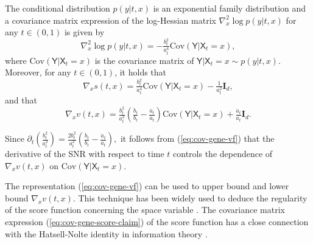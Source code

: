 \documentclass[twoside,11pt]{article}
\def\rmI{{\mathbf{I}}}
\newcommand{\Cov}{\mathrm{Cov}}
\def\paref#1{(\ref{#1})}
\numberwithin{equation}{section}
\begin{document}
\begin{lemma} \label{lm:cond-cov}
The conditional distribution $p(y | t, x)$ is an exponential family distribution and a covariance matrix expression of the log-Hessian matrix $\nabla^2_x \log p(y | t, x)$ for any $t \in (0, 1)$ is given by
\begin{equation}
    \label{eq:cov-cond-score-claim}
    \nabla^2_x \log p(y | t, x) = - \tfrac{b_t^2} {a_t^4} \Cov (\mathsf{Y} | \mathsf{X}_t = x),
\end{equation}
where $\Cov (\mathsf{Y} | \mathsf{X}_t = x)$ is the covariance matrix of $\mathsf{Y} | \mathsf{X}_t = x \sim p(y | t, x)$.
Moreover, for any $t \in (0, 1)$, it holds that
\begin{equation}
    \label{eq:cov-gene-score-claim}
    \nabla_x s(t, x) = \tfrac{b_t^2} {a_t^4} \Cov (\mathsf{Y} | \mathsf{X}_t = x) - \tfrac{1}{a_t^2} \rmI_d,
\end{equation}
and that
\begin{equation}
    \label{eq:cov-gene-vf}
    \nabla_x v(t, x) = \tfrac{b_t^2}{a_t^2} \left( \tfrac{\dot{b}_t}{b_t} - \tfrac{\dot{a}_t}{a_t} \right) \Cov (\mathsf{Y} | \mathsf{X}_t = x) + \tfrac{\dot{a}_t} {a_t} \rmI_d.
\end{equation}
\end{lemma}

\begin{remark}
Since $\partial_t \left( \tfrac{b_t^2}{a_t^2} \right) = \tfrac{2 b_t^2}{a_t^2} \left( \tfrac{\dot{b}_t}{b_t} - \tfrac{\dot{a}_t}{a_t} \right),$
it follows from (\ref{eq:cov-gene-vf}) that the derivative of the SNR with respect to  time $t$ controls the dependence of $\nabla_x v(t, x)$ on $\Cov (\mathsf{Y} | \mathsf{X}_t = x)$.
\end{remark}


The representation \paref{eq:cov-gene-vf} can be used to upper bound and lower bound $\nabla_x v(t, x)$. This technique has been widely used to deduce the regularity of the score function concerning the space variable \citep{mikulincer2021brownian, mikulincer2023lipschitz, chen2023sampling, lee2023convergence, chen2023improved}. The covariance matrix expression \paref{eq:cov-gene-score-claim} of the score function has a close connection with the Hatsell-Nolte identity in information theory \citep{hatsell1971some, palomar2005gradient, wu2011functional, cai2014optimal, wibisono2017information, wibisono2018convexity-heat, wibisono2018convexity-ou, dytso2023meta, dytso2023conditional}.
\end{document}
